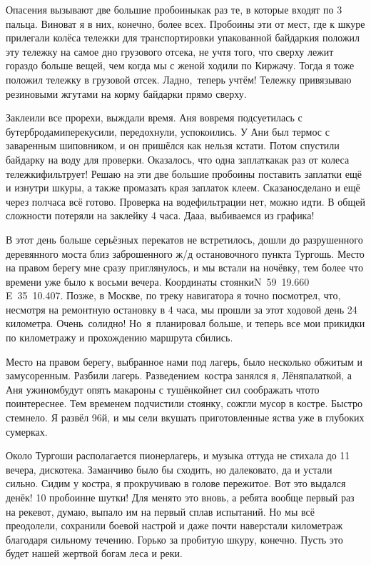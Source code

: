 Опасения вызывают две большие пробоины\mdash как раз те, в которые входят по 3 пальца. Виноват я в них, конечно, более всех. Пробоины эти от мест, где к шкуре прилегали колёса тележки для транспортировки упакованной байдарки\mdash я положил эту тележку на самое дно грузового отсека, не учтя того, что сверху лежит гораздо больше вещей, чем когда мы с женой ходили по Киржачу. Тогда я тоже положил тележку в грузовой отсек. Ладно,~теперь учтём! Тележку привязываю резиновыми жгутами на корму байдарки прямо сверху. 

Заклеили все прорехи, выждали время. Аня вовремя подсуетилась с бутербродами\mdash перекусили, передохнули, успокоились. У Ани был термос с заваренным шиповником, и он пришёлся как нельзя кстати. Потом спустили байдарку на воду для проверки. Оказалось, что одна заплатка\mdash как раз от колеса тележки\mdash фильтрует! Решаю на эти две большие пробоины поставить заплатки ещё и изнутри шкуры, а также промазать края заплаток клеем. Сказано\mdash сделано и ещё через полчаса всё готово. Проверка на воде\mdash фильтрации нет, можно идти. В общей сложности потеряли на заклейку 4 часа. Да\sdash а\sdash а, выбиваемся из графика! 

В этот день больше серьёзных перекатов не встретилось, дошли до разрушенного деревянного моста близ заброшенного ж/д остановочного пункта Тургошь. Место на правом берегу мне сразу приглянулось, и мы встали на ночёвку, тем более что времени уже было к восьми вечера. Координаты стоянки\mdash N~59\degree~19.660\textprime~ E~35\degree~10.407\textprime. Позже, в Москве, по треку навигатора я точно посмотрел, что, несмотря на ремонтную остановку в 4 часа, мы прошли за этот ходовой день 24 километра. Очень~солидно! Но~я~планировал больше, и теперь все мои прикидки по километражу и прохождению маршрута сбились.
 
Место на правом берегу, выбранное нами под лагерь, было несколько обжитым и замусоренным. Разбили лагерь. Разведением~костра занялся я, Лёня\mdash палаткой, а Аня ужином\mdash будут опять макароны с тушёнкой\mdash нет сил соображать что\sdash то поинтереснее. Тем временем подчистили стоянку, сожгли мусор в костре. Быстро стемнело. Я развёл 96\sdash й, и мы сели вкушать приготовленные яства уже в глубоких сумерках.

Около Тургоши располагается пионерлагерь, и музыка оттуда не стихала до 11 вечера, дискотека. Заманчиво было бы сходить, но далековато, да и устали сильно. Сидим у костра, я прокручиваю в голове пережитое. Вот это выдался денёк! 10 пробоин\mdash не шутки! Для меня\sdash то это вновь, а ребята вообще первый раз на реке\mdash вот, думаю, выпало им на первый сплав испытаний. Но мы всё преодолели, сохранили боевой настрой и даже почти наверстали километраж благодаря сильному течению. Горько за пробитую шкуру, конечно. Пусть это будет нашей жертвой богам леса и реки.


